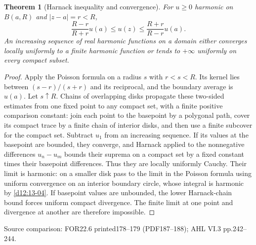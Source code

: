 \documentclass[11pt,a4paper,openany]{book}
\newtheorem{theorem}{Theorem}[chapter]
\theoremstyle{definition}
\theoremstyle{remark}\newtheorem{remark}[theorem]{Remark}
\newcommand{\family}[1]{}
\newcommand{\source}[1]{\par\begingroup\small\sffamily\color{black!65}Source comparison: #1\par\endgroup}
\begin{document}
\begin{theorem}[Harnack inequality and convergence]\family{D12.13.06}\label{d12:13-06}
For $u\ge0$ harmonic on $B(a,R)$ and $|z-a|=r<R$,
\[
 \frac{R-r}{R+r}u(a)\le u(z)\le\frac{R+r}{R-r}u(a).
\]
An increasing sequence of real harmonic functions on a domain either converges locally uniformly to a finite harmonic function or tends to $+\infty$ uniformly on every compact subset.
\end{theorem}
\begin{proof}
Apply the Poisson formula on a radius $s$ with $r<s<R$. Its kernel lies between $(s-r)/(s+r)$ and its reciprocal, and the boundary average is $u(a)$. Let $s\uparrow R$. Chains of overlapping disks propagate these two-sided estimates from one fixed point to any compact set, with a finite positive comparison constant: join each point to the basepoint by a polygonal path, cover its compact trace by a finite chain of interior disks, and then use a finite subcover for the compact set.
Subtract $u_1$ from an increasing sequence. If its values at the basepoint are bounded, they converge, and Harnack applied to the nonnegative differences $u_n-u_m$ bounds their suprema on a compact set by a fixed constant times their basepoint differences. Thus they are locally uniformly Cauchy. Their limit is harmonic: on a smaller disk pass to the limit in the Poisson formula using uniform convergence on an interior boundary circle, whose integral is harmonic by \cref{d12:13-04}. If basepoint values are unbounded, the lower Harnack-chain bound forces uniform compact divergence. The finite limit at one point and divergence at another are therefore impossible.
\end{proof}
\source{FOR22.6 printed178--179 (PDF187--188); AHL VI.3 pp.242--244.}
\end{document}

